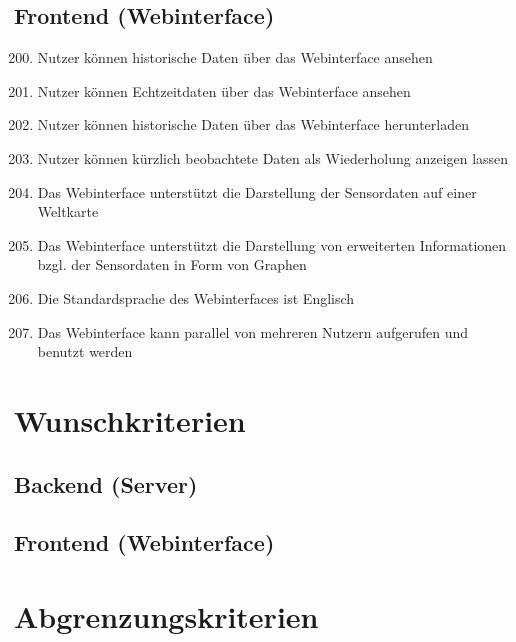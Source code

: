 \subsection{Frontend (Webinterface)}
\begin{enumerate}[label=\textbf{MK\arabic{enumi}0}]
	\setcounter{enumi}{199}
	\item Nutzer können historische Daten über das Webinterface ansehen
	\item Nutzer können Echtzeitdaten über das Webinterface ansehen
	\item Nutzer können historische Daten über das Webinterface herunterladen
	\item Nutzer können kürzlich beobachtete Daten als Wiederholung anzeigen lassen
	\item Das Webinterface unterstützt die Darstellung der Sensordaten auf einer Weltkarte
	\item Das Webinterface unterstützt die Darstellung von erweiterten Informationen bzgl. der Sensordaten in Form von Graphen
	\item Die Standardsprache des Webinterfaces ist Englisch
	\item Das Webinterface kann parallel von mehreren Nutzern aufgerufen und benutzt werden
\end{enumerate}

\section{Wunschkriterien}
\subsection{Backend (Server)}
\begin{enumerate}[label=\textbf{WK\arabic{enumi}0}]
	
\end{enumerate}
\subsection{Frontend (Webinterface)}
\begin{enumerate}[label=\textbf{WK\arabic{enumi}0}]
	
\end{enumerate}

\section{Abgrenzungskriterien}